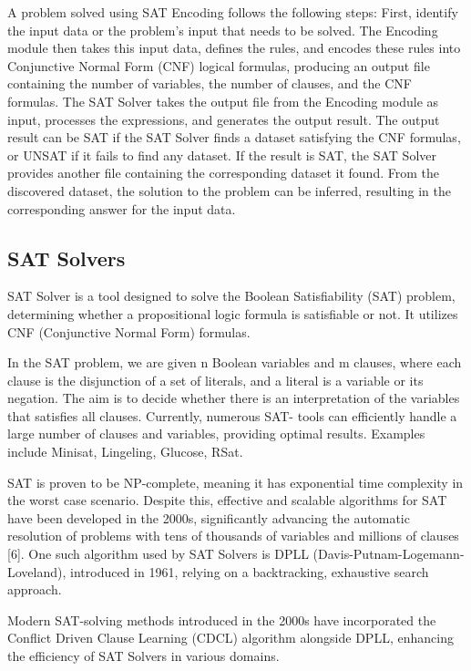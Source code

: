 A problem solved using SAT Encoding follows the following steps: First, identify the
input data or the problem's input that needs to be solved. The Encoding module then
takes this input data, defines the rules, and encodes these rules into Conjunctive Normal
Form\cite{cnf} (CNF) logical formulas, producing an output file containing the number of
variables, the number of clauses, and the CNF formulas. The SAT Solver takes the
output file from the Encoding module as input, processes the expressions, and generates
the output result. The output result can be SAT if the SAT Solver finds a dataset
satisfying the CNF formulas, or UNSAT if it fails to find any dataset. If the result is
SAT, the SAT Solver provides another file containing the corresponding dataset it
found. From the discovered dataset, the solution to the problem can be inferred, resulting
in the corresponding answer for the input data.

\subsection{SAT Solvers}
SAT Solver is a tool designed to solve the Boolean Satisfiability (SAT) problem,
determining whether a propositional logic formula is satisfiable or not. It utilizes CNF
(Conjunctive Normal Form\cite{cnf}) formulas.

In the SAT problem, we are given n Boolean variables and m clauses, where each clause
is the disjunction of a set of literals, and a literal is a variable or its negation. The aim is
to decide whether there is an interpretation of the variables that satisfies all clauses.
Currently, numerous SAT- tools can efficiently handle a large number of clauses and
variables, providing optimal results. Examples include Minisat\cite{minisat}, Lingeling\cite{lingeling},
Glucose\cite{glucose}, RSat\cite{rsat}.

SAT is proven to be NP-complete\cite{SATNPComplete}, meaning it has exponential time complexity in the
worst case scenario. Despite this, effective and scalable algorithms for SAT have been
developed in the 2000s, significantly advancing the automatic resolution of problems
with tens of thousands of variables and millions of clauses [6]. One such algorithm used
by SAT Solvers is DPLL (Davis-Putnam-Logemann-Loveland), introduced in 1961,
relying on a backtracking, exhaustive search approach.

Modern SAT-solving methods introduced in the 2000s have incorporated the Conflict
Driven Clause Learning (CDCL) algorithm alongside DPLL, enhancing the efficiency
of SAT Solvers in various domains.

